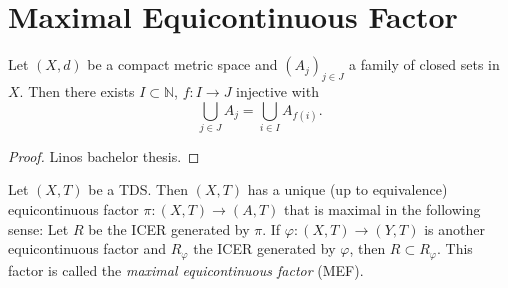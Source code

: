 \section{Maximal Equicontinuous Factor}
\begin{lemma}
  \label{lem:countableSubIntersection}
  Let $(X,d)$ be a compact metric space and $(A_j)_{j \in J}$ a family of closed sets in $X$.
  Then there exists $I \subset \mathbb{N}$, $f: I \to J$ injective with
  \begin{equation*}
    \bigcup_{j \in J} A_j = \bigcup_{i \in I} A_{f(i)}.
  \end{equation*}
\end{lemma}
\begin{proof}
  Linos bachelor thesis.
\end{proof}
\begin{theorem}
  Let $(X,T)$ be a TDS.
  Then $(X,T)$ has a unique (up to equivalence) equicontinuous factor $\pi : (X,T) \to (A,T)$ that is maximal in the following sense:
  Let $R$ be the ICER generated by $\pi$.
  If $\varphi : (X,T) \to (Y,T)$ is another equicontinuous factor and $R_\varphi$ the ICER generated by $\varphi$, then $R \subset R_\varphi$.
  This factor is called the \emph{maximal equicontinuous factor} (MEF).
\end{theorem}
